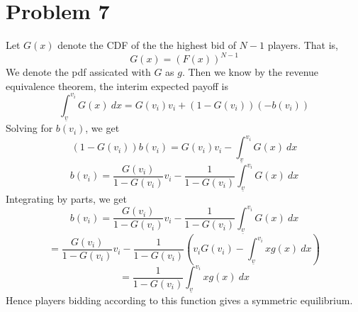 \documentclass[10pt,letter]{article}
\begin{document}
\section*{Problem 7}
Let $G(x)$ denote the CDF of the the highest bid of $N-1$ players. That is,
\[ G(x) = (F(x))^{N-1} \]
We denote the pdf assicated with $G$ as $g$. Then we know by the revenue equivalence theorem, the interim expected payoff is
\[ \int_{\underline{v}}^{v_i} G(x) \ dx = G(v_i) v_i + (1-G(v_i))(- b(v_i))  \]
Solving for $b(v_i)$, we get
\[ (1-G(v_i)) b(v_i) = G(v_i) v_i - \int_{\underline{v}}^{v_i} G(x) \ dx    \]
\[  b(v_i) = \frac{G(v_i)}{1-G(v_i)} v_i -\frac{1}{1-G(v_i)} \int_{\underline{v}}^{v_i} G(x) \ dx    \]
Integrating by parts, we get
\[  b(v_i) = \frac{G(v_i)}{1-G(v_i)} v_i -\frac{1}{1-G(v_i)} \int_{\underline{v}}^{v_i} G(x) \ dx    \]
\[ = \frac{G(v_i)}{1-G(v_i)} v_i - \frac{1}{1-G(v_i)}  \left( v_i G(v_i) - \int_{\underline{v}}^{v_i} x g(x) \ dx  \right)  \]
\[ =   \frac{1}{1-G(v_i)}\int_{\underline{v}}^{v_i} x g(x) \ dx   \]
Hence players bidding according to this function gives a symmetric equilibrium.
\end{document}
